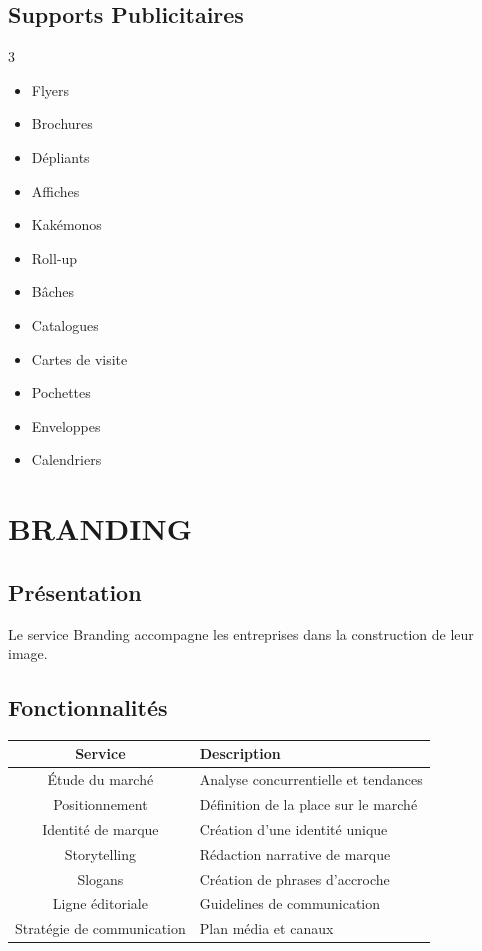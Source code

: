\documentclass[12pt,a4paper,oneside]{book}
\begin{document}
\section{Supports Publicitaires}
\begin{multicols}{3}
\begin{itemize}
\item Flyers
\item Brochures
\item Dépliants
\item Affiches
\item Kakémonos
\item Roll-up
\item Bâches
\item Catalogues
\item Cartes de visite
\item Pochettes
\item Enveloppes
\item Calendriers
\end{itemize}
\end{multicols}

\chapter{BRANDING}

\section{Présentation}
Le service Branding accompagne les entreprises dans la construction de leur image.

\section{Fonctionnalités}
\begin{center}
\begin{tabular}{|c|p{10cm}|}
\hline
\rowcolor{electronpurple}
\color{white}\textbf{Service} & \color{white}\textbf{Description} \\
\hline
Étude du marché & Analyse concurrentielle et tendances \\
\hline
Positionnement & Définition de la place sur le marché \\
\hline
Identité de marque & Création d'une identité unique \\
\hline
Storytelling & Rédaction narrative de marque \\
\hline
Slogans & Création de phrases d'accroche \\
\hline
Ligne éditoriale & Guidelines de communication \\
\hline
Stratégie de communication & Plan média et canaux \\
\hline
\end{tabular}
\end{center}
\end{document}
